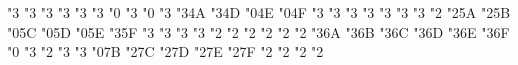 \mathchardef \sqsubset   "3
\mathchardef \sqsupset   "3
\mathchardef \vartriangleright   "3
\mathchardef \vartriangleleft   "3
\mathchardef \trianglerighteq   "3
\mathchardef \trianglelefteq   "3
\mathchardef \bigstar   "0
\mathchardef \between   "3
\mathchardef \blacktriangledown   "0
\mathchardef \blacktriangleright   "3
\mathchardef \blacktriangleleft   "3\amsafam 4A
\mathchardef \vartriangle   "3\amsafam 4D
\mathchardef \blacktriangle   "0\amsafam 4E
\mathchardef \triangledown   "0\amsafam 4F
\mathchardef \eqcirc   "3
\mathchardef \lesseqgtr   "3
\mathchardef \gtreqless   "3
\mathchardef \lesseqqgtr   "3
\mathchardef \gtreqqless   "3
\mathchardef \Rrightarrow   "3
\mathchardef \Lleftarrow   "3
\mathchardef \veebar   "2
\mathchardef \barwedge   "2\amsafam 5A
\mathchardef \doublebarwedge   "2\amsafam 5B
\mathchardef \angle   "0\amsafam 5C
\mathchardef \measuredangle   "0\amsafam 5D
\mathchardef \sphericalangle   "0\amsafam 5E
\mathchardef \varpropto   "3\amsafam 5F
\mathchardef \smallsmile   "3
\mathchardef \smallfrown   "3
\mathchardef \Subset   "3
\mathchardef \Supset   "3
\mathchardef \Cup   "2
\mathchardef \Cap   "2
\mathchardef \curlywedge   "2
\mathchardef \curlyvee   "2
\mathchardef \leftthreetimes   "2
\mathchardef \rightthreetimes   "2
\mathchardef \subseteqq   "3\amsafam 6A
\mathchardef \supseteqq   "3\amsafam 6B
\mathchardef \bumpeq   "3\amsafam 6C
\mathchardef \Bumpeq   "3\amsafam 6D
\mathchardef \lll   "3\amsafam 6E
\mathchardef \ggg   "3\amsafam 6F
\def \ulcorner {\delimiter"4\amsafam 70\amsafam 70 }
\def \urcorner {\delimiter"5\amsafam 71\amsafam 71 }
\mathchardef \circledS   "0
\mathchardef \pitchfork   "3
\mathchardef \dotplus   "2
\mathchardef \backsim   "3
\mathchardef \backsimeq   "3
\def \llcorner {\delimiter"4\amsafam 78\amsafam 78 }
\def \lrcorner {\delimiter"5\amsafam 79\amsafam 79 }
\mathchardef \complement   "0\amsafam 7B
\mathchardef \intercal   "2\amsafam 7C
\mathchardef \circledcirc   "2\amsafam 7D
\mathchardef \circledast   "2\amsafam 7E
\mathchardef \circleddash   "2\amsafam 7F
\mathchardef \rhd   "2
\mathchardef \lhd   "2
\mathchardef \unrhd   "2
\mathchardef \unlhd   "2

   \let\restriction\upharpoonright
   \let\Doteq\doteqdot
   \let\doublecup\Cup
   \let\doublecap\Cap
   \let\llless\lll
   \let\gggtr\ggg
   \let\Box=\square %
   \let\Box=\square %


